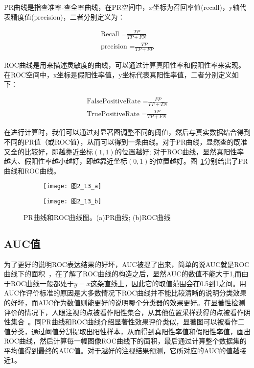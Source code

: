 PR曲线是指查准率-查全率曲线，在PR空间中，$x$坐标为召回率值(recall)，y轴代表精度值(precision)，二者分别定义为：
\begin{linenomath}
\begin{align}
\textrm{Recall =$\frac{TP}{TP+FN}$}\label{式2_38}\\
\textrm{precision =$\frac{TP}{TP+FP}$}\label{式2_39}
\end{align}
\end{linenomath}

ROC曲线是用来描述灵敏度的曲线，可以通过计算真阳性率和假阳性率来实现。在ROC空间中，x坐标是假阳性率值，y坐标代表真阳性率值，二者分别定义如下：
\begin{linenomath}
\begin{align}
\textrm{FalsePositiveRate =$\frac{FP}{FP+TN}$}\label{式2_40}\\
\textrm{TruePositiveRate =$\frac{TP}{TP+FN}$}\label{式2_41}
\end{align}
\end{linenomath}

在进行计算时，我们可以通过对显著图调整不同的阈值，然后与真实数据结合得到不同的PR值（或ROC值），从而可以得到一条曲线。对于PR曲线，显然查的既准又全的比较好，即越靠近坐标$(1,1)$的位置越好; 对于ROC曲线，显然真阳性率越大、假阳性率越小越好，即越靠近坐标$(0,1)$的位置越好。图~\ref{图2_13}分别给出了PR曲线和ROC曲线。
\begin{figure}[h]
  \centering%
  \begin{subfigure}{0.4\textwidth}
    \texttt{[image: 图2\_13\_a]}
    \caption{}
  \end{subfigure}
  \hspace{4em}%
  \begin{subfigure}{0.4\textwidth}
    \texttt{[image: 图2\_13\_b]}
    \caption{}
  \end{subfigure}
  \caption{PR曲线和ROC曲线图。(a)PR曲线; (b)ROC曲线}
  \label{图2_13}
\end{figure}

\subsection{AUC值}
\label{2_5_2}

为了更好的说明ROC表达结果的好坏，AUC被提了出来，简单的说AUC就是ROC曲线下的面积~\cite{Green1966book}，在了解了ROC曲线的构造之后，显然AUC的数值不能大于1,而由于ROC曲线一般都处于$y=x$这条直线上，因此它的取值范围会在0.5到1之间。用AUC作评价标准的原因是大多数情况下ROC曲线并不能比较清晰的说明分类效果的好坏，而AUC作为数值则能更好的说明哪个分类器的效果更好。在显著性检测评价的情况下，人眼注视的点被看作阳性集合，从其他位置采样获得的点被看作阴性集合~\cite{Tatler2005correlates}。同PR曲线和ROC曲线介绍显著性效果评价类似，显著图可以被看作二值分类，通过阈值分割提取出阳性样本，从而得到真阳性率值和假阳性率值，画出ROC曲线，然后计算每一幅图像ROC曲线下的面积，最后通过计算整个数据集的平均值得到最终的AUC值。对于越好的注视结果预测，它所对应的AUC的值越接近1。

